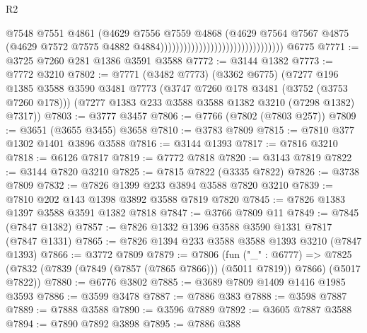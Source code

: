 \begin{lexlean}{R2}
\begin{coremodule}
                                                              @7548
                                                              @7551
                                                              @4861
                                                              (@4629
                                                                @7556
                                                                @7559
                                                                @4868
                                                                (@4629
                                                                  @7564
                                                                  @7567
                                                                  @4875
                                                                  (@4629
                                                                    @7572
                                                                    @7575
                                                                    @4882
                                                                    @4884))))))))))))))))))))))))))))))))
    @6775
@7771 := @3725 @7260 @281 @1386 @3591 @3588
@7772 := @3144 @1382
@7773 := @7772 @3210
@7802 := @7771
    (@3482 @7773)
    (@3362 @6775)
    (@7277
      @196
      @1385
      @3588
      @3590
      @3481
      @7773
      (@3747 @7260 @178 @3481 (@3752 (@3753 @7260 @178)))
      (@7277 @1383 @233 @3588 @3588 @1382 @3210 (@7298 @1382) @7317))
@7803 := @3777 @3457
@7806 := @7766 (@7802 (@7803 @257))
@7809 := @3651 (@3655 @3455) @3658
@7810 := @3783 @7809
@7815 := @7810 @377 @1302 @1401 @3896 @3588
@7816 := @3144 @1393
@7817 := @7816 @3210
@7818 := @6126 @7817
@7819 := @7772 @7818
@7820 := @3143 @7819
@7822 := @3144 @7820 @3210
@7825 := @7815 @7822 (@3335 @7822)
@7826 := @3738 @7809
@7832 := @7826 @1399 @233 @3894 @3588 @7820 @3210
@7839 := @7810 @202 @143 @1398 @3892 @3588 @7819 @7820
@7845 := @7826 @1383 @1397 @3588 @3591 @1382 @7818
@7847 := @3766 @7809 @11
@7849 := @7845 (@7847 @1382)
@7857 := @7826 @1332 @1396 @3588 @3590 @1331 @7817 (@7847 @1331)
@7865 := @7826 @1394 @233 @3588 @3588 @1393 @3210 (@7847 @1393)
@7866 := @3772 @7809
@7879 := @7806
    (fun ("_" : @6777) =>
    @7825 (@7832 (@7839 (@7849 (@7857 (@7865 @7866))) (@5011 @7819)) @7866) (@5017 @7822))
@7880 := @6776 @3802
@7885 := @3689 @7809 @1409 @1416 @1985 @3593
@7886 := @3599 @3478
@7887 := @7886 @383
@7888 := @3598 @7887
@7889 := @7888 @3588
@7890 := @3596 @7889
@7892 := @3605 @7887 @3588
@7894 := @7890 @7892 @3898
@7895 := @7886 @388

\end{coremodule}
\end{lexlean}
